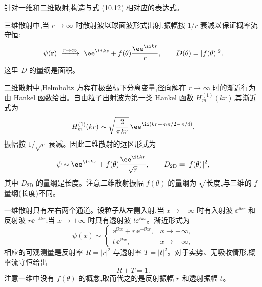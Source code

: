 \begin{question}
针对一维和二维散射,构造与式 (10.12) 相对应的表达式。

\par\smallskip
{}

\begin{solution}
三维散射中,当 $r\to\infty$ 时散射波以球面波形式出射,振幅按 $1/r$ 衰减以保证概率流守恒:
\[
\psi(\mathbf r)\;\xrightarrow{r\to\infty}\; \ee^{\ii kz}+f(\theta){\ee^{\ii kr}\over r},
\qquad
D(\theta)=|f(\theta)|^2.
\]
这里 $D$ 的量纲是面积。

二维散射中,Helmholtz 方程在极坐标下分离变量,径向解在 $r\to\infty$ 时的渐近行为由 Hankel 函数给出。自由粒子出射波为第一类 Hankel 函数 $H_m^{(1)}(kr)$,其渐近式为
\[
H_m^{(1)}(kr)\sim\sqrt{2\over\pi kr}\,\ee^{\ii(kr-m\pi/2-\pi/4)},
\]
振幅按 $1/\sqrt{r}$ 衰减。因此二维散射的远区形式为
\[
\psi\sim \ee^{\ii kx}+f(\theta){\ee^{\ii kr}\over\sqrt r},
\qquad
D_{\text{2D}}=|f(\theta)|^2,
\]
其中 $D_{\text{2D}}$ 的量纲是长度。注意二维散射振幅 $f(\theta)$ 的量纲为 $\sqrt{\text{长度}}$,与三维的 $f$ 量纲(长度)不同。

一维散射只有左右两个通道。设粒子从左侧入射,当 $x\to-\infty$ 时有入射波 $\ee^{\ii kx}$ 和反射波 $r\ee^{-\ii kx}$;当 $x\to+\infty$ 时只有透射波 $t\ee^{\ii kx}$。渐近形式为
\[
\psi(x)\sim\begin{cases}
\ee^{\ii kx}+r\,\ee^{-\ii kx}, & x\to-\infty,\\[4pt]
t\,\ee^{\ii kx}, & x\to+\infty,
\end{cases}
\]
相应的可观测量是反射率 $R=|r|^2$ 与透射率 $T=|t|^2$。对于实势、无吸收情形,概率流守恒给出
\[
\boxed{R+T=1.}
\]
注意一维中没有 $f(\theta)$ 的概念,取而代之的是反射振幅 $r$ 和透射振幅 $t$。
\end{solution}
\end{question}

